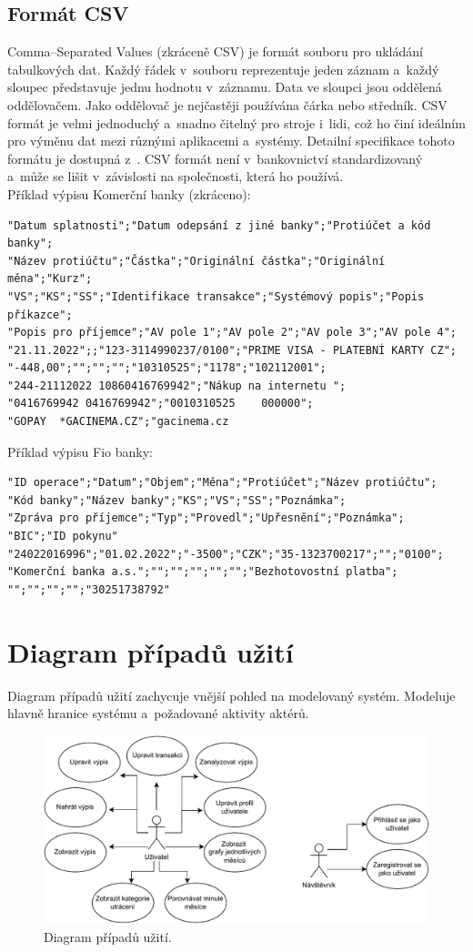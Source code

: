 \subsection*{Formát CSV}
Comma--Separated Values (zkráceně CSV) je formát souboru pro ukládání tabulkových dat. Každý řádek v~souboru reprezentuje jeden záznam a~každý sloupec představuje jednu hodnotu v~záznamu. Data ve sloupci jsou oddělená oddělovačem. Jako oddělovač je nejčastěji používána čárka nebo středník. CSV formát je velmi jednoduchý a~snadno čitelný pro stroje i~lidi, což ho činí ideálním pro výměnu dat mezi různými aplikacemi a~systémy. Detailní specifikace tohoto formátu je dostupná z~\cite{rfccsv}.
CSV formát není v~bankovnictví standardizovaný a~může se lišit v~závislosti na společnosti, která ho používá.
\\
Příklad výpisu Komerční banky (zkráceno):
\begin{verbatim}
"Datum splatnosti";"Datum odepsání z jiné banky";"Protiúčet a kód banky";
"Název protiúčtu";"Částka";"Originální částka";"Originální měna";"Kurz";
"VS";"KS";"SS";"Identifikace transakce";"Systémový popis";"Popis příkazce";
"Popis pro příjemce";"AV pole 1";"AV pole 2";"AV pole 3";"AV pole 4";
"21.11.2022";;"123-3114990237/0100";"PRIME VISA - PLATEBNÍ KARTY CZ";
"-448,00";"";"";"";"10310525";"1178";"102112001";
"244-21112022 10860416769942";"Nákup na internetu ";
"0416769942 0416769942";"0010310525    000000";
"GOPAY  *GACINEMA.CZ";"gacinema.cz 
\end{verbatim}
Příklad výpisu Fio banky:
\begin{verbatim}
"ID operace";"Datum";"Objem";"Měna";"Protiúčet";"Název protiúčtu";
"Kód banky";"Název banky";"KS";"VS";"SS";"Poznámka";
"Zpráva pro příjemce";"Typ";"Provedl";"Upřesnění";"Poznámka";
"BIC";"ID pokynu"
"24022016996";"01.02.2022";"-3500";"CZK";"35-1323700217";"";"0100";
"Komerční banka a.s.";"";"";"";"";"";"Bezhotovostní platba";
"";"";"";"";"30251738792"    
\end{verbatim}

\section{Diagram případů užití}
Diagram případů užití zachycuje vnější pohled na modelovaný systém. Modeluje hlavně hranice systému a~požadované aktivity aktérů.

\begin{figure}[h]
\centering
\includegraphics[width=\textwidth]{obrazky-figures/use_case.pdf}
\caption{Diagram případů užití.}
\label{fig;usecase}
\end{figure}

